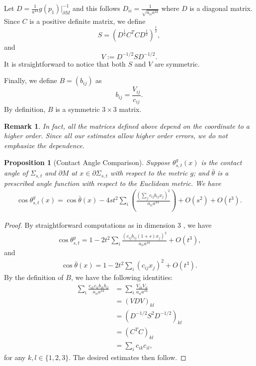 \documentclass[11pt,letterpaper]{amsart}
\newtheorem{prop}{Proposition}[section]
\newtheorem{rem}{Remark}[section]
\begin{document}
Let $D= \frac{1}{a^{44}} g(p_{1})|_{\partial M}^{-1}$ and this follows $D_{ii} = \frac{1}{\sqrt{a_{ii} a^{44}}}$ where $D$ is a diagonal matrix. Since $C$ is a positive definite matrix, we define 
    \[
    S=\left(D^{\frac{1}{2}}C^TCD^{\frac{1}{2}}\right)^{\frac{1}{2}},
    \]
    and
    \[
    V:=D^{-1/2}SD^{-1/2}.
    \]
    It is straightforward to notice that both $S$ and $V$ are symmetric.

    Finally, we define $B=(b_{ij})$ as
    \[
    b_{ij}=\frac{V_{ij}}{c_{ij}}.
    \]
   By definition, $B$ is a symmetric $3\times 3$ matrix. 
   \begin{rem}
       In fact, all the matrices defined above depend on the coordinate to a higher order. Since all our estimates allow higher order errors, we do not emphasize the dependence.
   \end{rem} 
\begin{prop} [Contact Angle Comparison]\label{firstcontactanglecomp}
    Suppose $\theta^{g}_{s,t}(x)$ is the contact angle of $\Sigma_{s,t}$ and $\partial M$ at $x\in \partial\Sigma_{s,t}$ with respect to the metric $g$; and $\bar{\theta}$ is a prescribed angle function with respect to the Euclidean metric. 
    We have
    \begin{align}
        \cos\theta^g_{s,t}(x)=\cos\bar{\theta}(x)-4st^2\sum_i\left(\frac{(\sum_jc_{ij}b_{ij}x_{j})^2}{a_{ii}a^{44}}\right)+O(s^2)+O(t^3).
    \end{align}
\end{prop}
\begin{proof}
By straightforward computations as in dimension $3$ \cite{koyao}, we have 
    \begin{align*}
        \cos\theta^g_{s,t}=1-2t^2\sum_{i}\frac{(c_{ij}b_{ij}(1+s)x_{j})^2}{a_{ii}a^{44}}+O(t^3),
    \end{align*}
    and
    \begin{align*}
        \cos\bar{\theta}(x)=1-2t^2\sum_{i}(c_{ij}x_{j})^2+O(t^3).
    \end{align*}
    By the definition of $B$, we have the following identities:
    \begin{align*}
    \sum_{i}\frac{c_{ik}c_{i l}b_{ik}b_{il}}{a_{ii}a^{44}}&=\sum_{i}\frac{V_{ik}V_{il}}{a_{ii}a^{44}}\\
    &=(VDV)_{kl}\\
    &=(D^{-1/2}S^2D^{-1/2})_{kl}\\
    &=(C^TC)_{kl}\\
    &=\sum_{i}c_{ik}c_{il},
    \end{align*}
    for any $k,l\in \{1,2,3\}$.
    The desired estimates then follow.
\end{proof}
\end{document}
